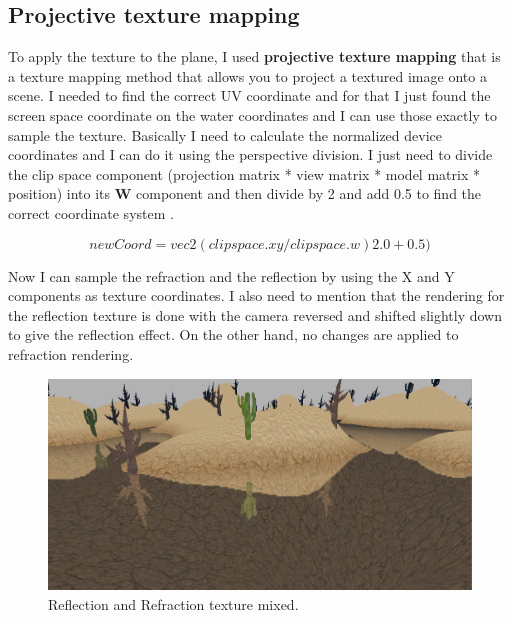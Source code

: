 \subsection{Projective texture mapping}
To apply the texture to the plane, I used \textbf{projective texture mapping} that is a texture mapping method that allows you to project a textured image onto a scene. I needed to find the correct UV coordinate and for that I just found the screen space coordinate on the water coordinates and I can use those exactly to sample the texture. Basically I need to calculate the normalized device coordinates and I can do it using the perspective division. I just need to divide the clip space component (projection matrix * view matrix * model matrix * position) into its \textbf{W} component and then divide by 2 and add 0.5 to find the correct coordinate system .

\begin{equation}
newCoord = vec2(clipspace.xy / clipspace.w) 2.0 + 0.5)		
\end{equation}

\noindent
Now I can sample the refraction and the reflection by using the X and Y components as texture coordinates.
I also need to mention that the rendering for the reflection texture is done with the camera reversed and shifted slightly down to give the reflection effect. On the other hand, no changes are applied to refraction rendering.

\newpage

\begin{figure}[hbt!]
	\centering
	\includegraphics[width= 1
	\textwidth]{images/Water3.png}
	\caption{Reflection and Refraction texture mixed.}
\end{figure} 